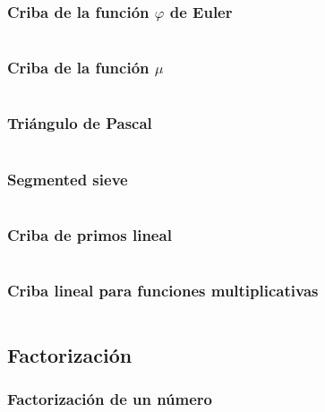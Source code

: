 \documentclass[11pt]{article}
\begin{document}
			\subsubsection{Criba de la función $\varphi$ de Euler}
			\inputminted[tabsize=2,breaklines,firstline=172,lastline=180,fontsize=\small]{c++}{numberTheory.cpp}
			
			\subsubsection{Criba de la función $\mu$}
			\inputminted[tabsize=2,breaklines,firstline=801,lastline=809,fontsize=\small]{c++}{numberTheory.cpp}
			
			\subsubsection{Triángulo de Pascal}
			\inputminted[tabsize=2,breaklines,firstline=182,lastline=192,fontsize=\small]{c++}{numberTheory.cpp}
			
			\subsubsection{Segmented sieve}
			\inputminted[tabsize=2,breaklines,firstline=860,lastline=892,fontsize=\small]{c++}{numberTheory.cpp}
			
			\subsubsection{Criba de primos lineal}
			\inputminted[tabsize=2,breaklines,firstline=811,lastline=825,fontsize=\small]{c++}{numberTheory.cpp}
			
			\subsubsection{Criba lineal para funciones multiplicativas}
			\inputminted[tabsize=2,breaklines,firstline=827,lastline=858,fontsize=\small]{c++}{numberTheory.cpp}
			
		
		\subsection{Factorización}
			\subsubsection{Factorización de un número}
			\inputminted[tabsize=2,breaklines,firstline=194,lastline=207,fontsize=\small]{c++}{numberTheory.cpp}
			
\end{document}
